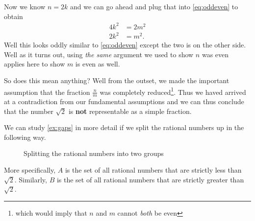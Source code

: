 \documentclass[../../templates/section]{subfiles}
\begin{document}
\begin{example}
Now we know $n = 2k$ and we can go ahead and plug that into \cref{eq:oddeven}
to obtain
\begin{align}
    4k^2 & = 2m^2 \nonumber \\
    2k^2 & = m^2. \label{eq:m-is-even}
\end{align}
Well this looks oddly similar to \cref{eq:oddeven} except the two is on the
other side. Well as it turns out, using \emph{the same} argument we used to
show $n$ was even applies here to show $m$ is even as well.

So does this mean anything? Well from the outset, we made the important
assumption that the fraction $\frac{n}{m}$ was completely
reduced\footnote{which would imply that $n$ and $m$ cannot \emph{both} be
even}. Thus we haved arrived at a contradiction from our fundamental
assumptions and we can thus conclude that the number $\sqrt{2}$ is \textbf{not}
representable as a simple fraction.
\end{example}

We can study \cref{ex:gaps} in more detail if we split the rational numbers up
in the following way.
\begin{figure}[!htb]
    \centering
\caption{Splitting the rational numbers into two groups}
\label{fig:split-rationals}
\end{figure}
More specifically, $A$ is the set of all rational numbers that are strictly
less than $\sqrt{2}$. Similarly, $B$ is the set of all rational numbers that
are strictly greater than $\sqrt{2}$.
\end{document}
